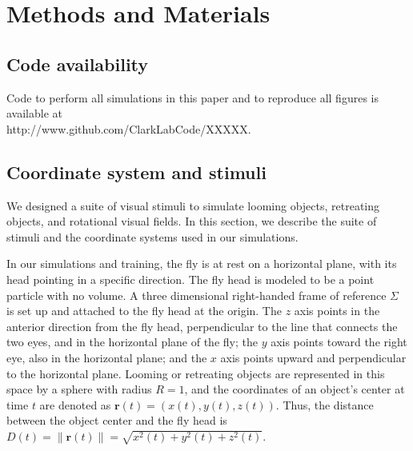 \documentclass[pdftex,9pt,lineno]{elife}
\begin{document}
\newpage

\section{Methods and Materials}

\subsection{Code availability}
Code to perform all simulations in this paper and to reproduce all figures is available at \\ http://www.github.com/ClarkLabCode/XXXXX.

\subsection{Coordinate system and stimuli}
We designed a suite of visual stimuli to simulate looming objects, retreating objects, and rotational visual fields. In this section, we describe the suite of stimuli and the coordinate systems used in our simulations.

In our simulations and training, the fly is at rest on a horizontal plane, with its head pointing in a specific direction. The fly head is modeled to be a point particle with no volume. A three dimensional right-handed frame of reference $\Sigma$ is set up and attached to the fly head at the origin. The $z$ axis points in the anterior direction from the fly head, perpendicular to the line that connects the two eyes, and in the horizontal plane of the fly; the $y$ axis points toward the right eye, also in the horizontal plane; and the $x$ axis points upward and perpendicular to the horizontal plane. Looming or retreating objects are represented in this space by a sphere with radius $R=1$, and the coordinates of an object's center at time $t$ are denoted as $\mathbf{r}(t) = (x(t),y(t),z(t))$. Thus, the distance between the object center and the fly head is $D(t) = \|\mathbf{r}(t)\| = \sqrt{x^{2}(t)+y^{2}(t)+z^{2}(t)}$.
\end{document}
